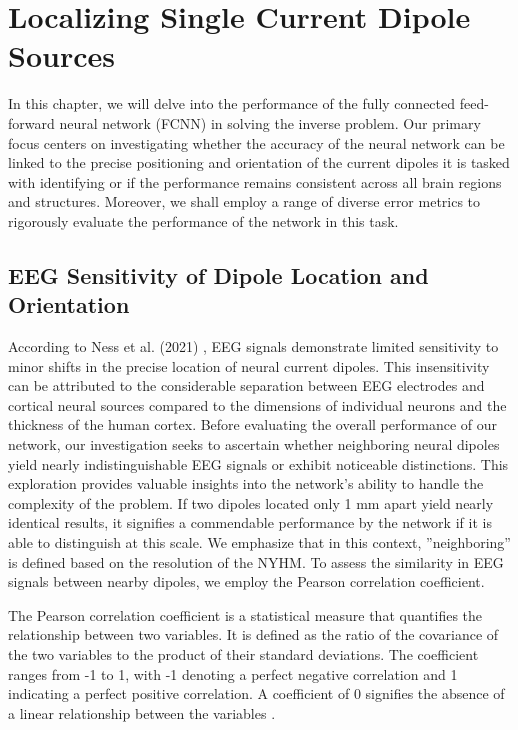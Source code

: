 \documentclass[a4paper, UKenglish, 11pt]{uiomaster}
\begin{document}
\chapter{Localizing Single Current Dipole Sources} \label{chap:simple_dipole_FCNN}
In this chapter, we will delve into the performance of the fully connected feed-forward neural network (FCNN) in solving the inverse problem. Our primary focus centers on investigating whether the accuracy of the neural network can be linked to the precise positioning and orientation of the current dipoles it is tasked with identifying or if the performance remains consistent across all brain regions and structures. Moreover, we shall employ a range of diverse error metrics to rigorously evaluate the performance of the network in this task.


\section{EEG Sensitivity of Dipole Location and Orientation}
According to Ness et al. (2021) \cite{naess2021biophysically}, EEG signals demonstrate limited sensitivity to minor shifts in the precise location of neural current dipoles. This insensitivity can be attributed to the considerable separation between EEG electrodes and cortical neural sources compared to the dimensions of individual neurons and the thickness of the human cortex. Before evaluating the overall performance of our network, our investigation seeks to ascertain whether neighboring neural dipoles yield nearly indistinguishable EEG signals or exhibit noticeable distinctions. This exploration provides valuable insights into the network's ability to handle the complexity of the problem. If two dipoles located only 1 mm apart yield nearly identical results, it signifies a commendable performance by the network if it is able to distinguish at this scale. We emphasize that  in this context, ''neighboring'' is defined based on the resolution of the NYHM. To assess the similarity in EEG signals between nearby dipoles, we employ the Pearson correlation coefficient.

The Pearson correlation coefficient is a statistical measure that quantifies the relationship between two variables. It is defined as the ratio of the covariance of the two variables to the product of their standard deviations. The coefficient ranges from -1 to 1, with -1 denoting a perfect negative correlation and 1 indicating a perfect positive correlation. A coefficient of 0 signifies the absence of a linear relationship between the variables \cite{numpy-docs}.
\end{document}
